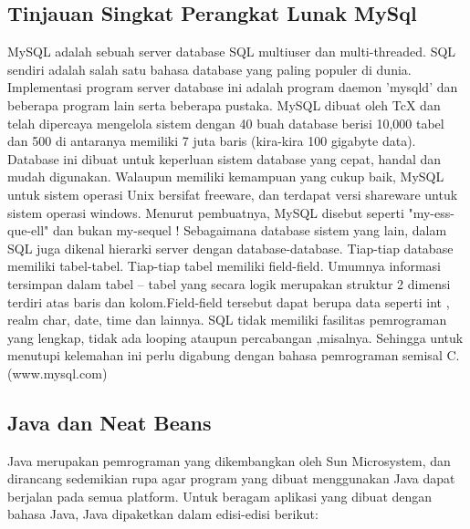 \documentclass{jtetiproposalskripsi}
\begin{document}
\subsection{Tinjauan Singkat Perangkat Lunak MySql}
MySQL adalah sebuah server database SQL multiuser dan multi-threaded. SQL  sendiri  adalah  salah  satu  bahasa  database  yang  paling  populer  di  dunia. Implementasi  program  server  database  ini  adalah  program  daemon  'mysqld'  dan beberapa program lain serta beberapa pustaka.
MySQL dibuat oleh TcX dan  telah dipercaya mengelola  sistem dengan 40  buah database berisi 10,000  tabel dan 500 di antaranya memiliki 7  juta baris (kira-kira 100  gigabyte  data).  Database  ini  dibuat  untuk  keperluan  sistem  database  yang cepat, handal dan mudah digunakan. Walaupun memiliki kemampuan yang cukup baik, MySQL  untuk  sistem  operasi  Unix  bersifat  freeware,  dan  terdapat  versi shareware untuk sistem operasi windows. Menurut pembuatnya, MySQL disebut seperti "my-ess-que-ell" dan bukan my-sequel ! 
Sebagaimana database sistem yang  lain, dalam SQL  juga dikenal hierarki server  dengan  database-database.  Tiap-tiap  database memiliki  tabel-tabel.  Tiap-tiap tabel memiliki field-field.  Umumnya  informasi  tersimpan dalam  tabel –  tabel yang secara  logik merupakan struktur 2 dimensi    terdiri atas baris dan kolom.Field-field  tersebut dapat berupa data seperti int , realm char, date, time dan lainnya.  
SQL  tidak  memiliki  fasilitas  pemrograman  yang  lengkap,  tidak  ada looping ataupun percabangan  ,misalnya. Sehingga untuk menutupi kelemahan  ini perlu digabung dengan bahasa pemrograman semisal C.   (www.mysql.com)


\subsection{Java dan Neat Beans}
Java merupakan pemrograman yang dikembangkan oleh Sun Microsystem, dan dirancang sedemikian rupa agar program yang dibuat menggunakan Java dapat berjalan pada semua platform. Untuk beragam aplikasi yang dibuat dengan bahasa Java, Java dipaketkan dalam edisi-edisi berikut:
\end{document}
